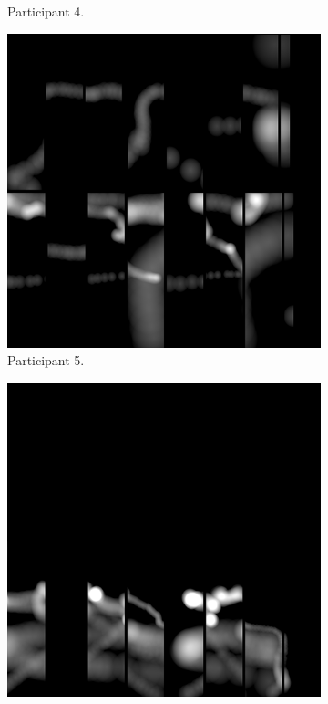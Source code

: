 \begin{figure}[!ht]
\begin{subfigure}[b]{0.24\textwidth}
        \caption{Participant 4.}
    \end{subfigure}
    \hfill
    \begin{subfigure}[b]{0.24\textwidth}
        \centering
        \includegraphics[width=\textwidth]{img/data/Panel2/single/5.png}
        \caption{Participant 5.}
    \end{subfigure}
    \hfill    
    \begin{subfigure}[b]{0.24\textwidth}
        \centering
        \includegraphics[width=\textwidth]{img/data/Panel2/single/6.png}

\end{subfigure}
\end{figure}
